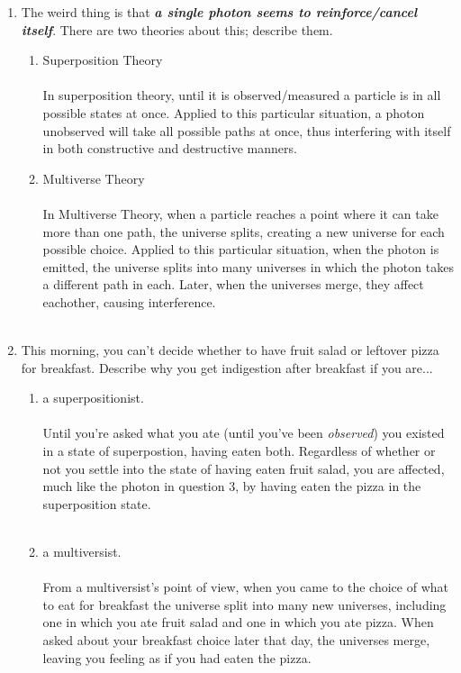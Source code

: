 \begin{enumerate}
\item The weird thing is that \textit{\textbf{a single photon seems to reinforce/cancel itself}}. There are two theories about this; describe them.
\begin{enumerate}
\item Superposition Theory\\
\\
In superposition theory, until it is observed/measured a particle is in all possible states at once. Applied to this particular situation, a photon unobserved will take all possible paths at once, thus interfering with itself in both constructive and destructive manners.\\


\item Multiverse Theory\\
\\
In Multiverse Theory, when a particle reaches a point where it can take more than one path, the universe splits, creating a new universe for each possible choice. Applied to this particular situation, when the photon is emitted, the universe splits into many universes in which the photon takes a different path in each. Later, when the universes merge, they affect eachother, causing interference.\\
\\
\end{enumerate}



\item This morning, you can't decide whether to have fruit salad or leftover pizza for breakfast.  Describe why you get indigestion after breakfast if you are...
\begin{enumerate}
\item a superpositionist.\\
\\
Until you're asked what you ate (until you've been \textit{observed}) you existed in a state of superpostion, having eaten both. Regardless of whether or not you settle into the state of having eaten fruit salad, you are affected, much like the photon in question 3, by having eaten the pizza in the superposition state.\\
\\
\item a multiversist.\\
\\
From a multiversist's point of view, when you came to the choice of what to eat for breakfast the universe split into many new universes, including one in which you ate fruit salad and one in which you ate pizza. When asked about your breakfast choice later that day, the universes merge, leaving you feeling as if you had eaten the pizza.


\end{enumerate}
\end{enumerate}

